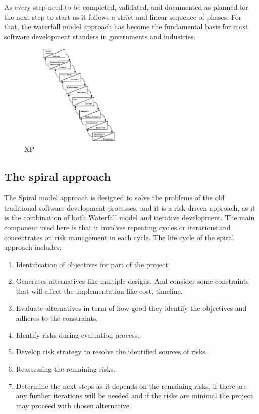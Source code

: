 \documentclass[conference,onecolumn]{IEEEtran}
\begin{document}
	As every step need to be completed, validated, and documented as planned for the next step to start as it follows a strict and linear sequence of phases. For that, the waterfall model approach has become the fundamental basis for most software development standers in governments and industries.
	\begin{figure}[H]
		\centering
		\includegraphics[width=0.5\textwidth]{Figures/XP.png}
		\caption{XP}
		\label{fig:XP}
	\end{figure}

\subsection{The spiral approach}
	The Spiral model approach is designed to solve the problems of the old traditional software development processes, and it is a risk-driven approach, as it is the combination of both Waterfall model and iterative development. The main component used here is that it involves repeating cycles or iterations and concentrates on risk management in each cycle. The life cycle of the spiral approach includes:

	\begin{enumerate}
		\item Identification of objectives for part of the project.
		\item Generates alternatives like multiple designs. And consider some constraints that will affect the implementation like cost, timeline.
		\item Evaluate alternatives in term of how good they identify the objectives and adheres to the constraints.
		\item Identify risks during evaluation process.
		\item Develop risk strategy to resolve the identified sources of risks.
		\item Reassessing the remaining risks.
		\item Determine the next steps as it depends on the remaining risks, if there are any further iterations will be needed and if the risks are minimal the project may proceed with chosen alternative.
	\end{enumerate}
\end{document}
